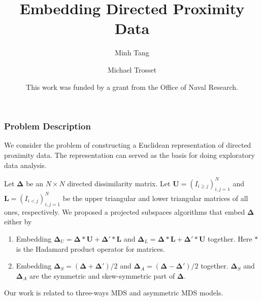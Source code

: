 \documentclass[professionalfonts,hyperref={pdfpagelabels=false,colorlinks=true,linkcolor=cyan}]{beamer}
\begin{document}
\title[Embedding Directed Proximity Data]{Embedding Directed Proximity Data}
\author[Tang \& Trosset]{Minh Tang \and Michael
  Trosset}
\date[JSM 2010]{This work was funded by a grant from the Office of Naval Research.}

\begin{frame}
\titlepage
\end{frame}

\begin{frame}
  \frametitle{Problem Description}
  We consider the problem of constructing a Euclidean representation
  of directed proximity data. The representation can served as the
  basis for doing exploratory data analysis. 

  \vskip10pt Let $\bm{\Delta}$ be an $N \times N$ directed
  dissimilarity matrix. Let $\mathbf{U} = (I_{i \geq j})_{i,j=1}^{N}$ and
  $\mathbf{L} = (I_{i < j})_{i,j=1}^{N}$ be the upper triangular and
  lower triangular matrices of all ones, respectively. We proposed a projected
  subspaces algorithms that embed $\bm{\Delta}$ either by
 \begin{enumerate}
  \item Embedding $\bm{\Delta}_U = \bm{\Delta} \ast \mathbf{U} +
    \bm{\Delta}' \ast \mathbf{L}$ and $\bm{\Delta}_{L} =
    \bm{\Delta} \ast \mathbf{L} + \bm{\Delta}' \ast \mathbf{U}$
    together. Here $\ast$ is the Hadamard product operator for
    matrices.
  \item Embedding $\bm{\Delta}_S = (\bm{\Delta} + \bm{\Delta}')/2$
    and $\bm{\Delta}_{A} = (\bm{\Delta} - \bm{\Delta}')/2$
    together. $\bm{\Delta}_S$ and $\bm{\Delta}_{A}$ are the symmetric
    and skew-symmetric part of $\bm{\Delta}$.
  \end{enumerate}
  Our work is related to three-ways MDS and asymmetric MDS models.
\end{frame}
\end{document}
